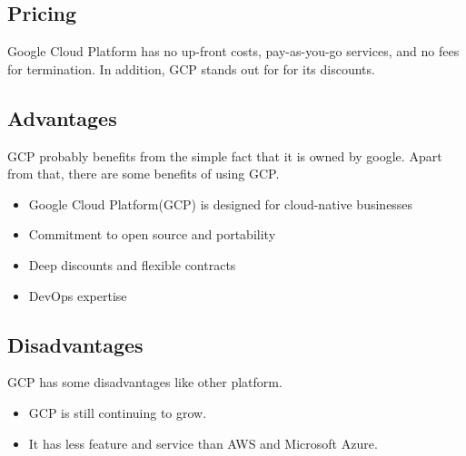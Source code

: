 %
%
\subsection{Pricing}
%
Google Cloud Platform has no up-front costs, pay-as-you-go services, and no fees for termination. In addition, GCP stands out for for its discounts. 
%
\subsection{Advantages}
%
GCP probably benefits from the simple fact that it is owned by google. Apart from that, there are some benefits of using GCP. 
\begin{itemize}
    \item Google Cloud Platform(GCP) is designed for cloud-native businesses
    \item Commitment to open source and portability
    \item Deep discounts and flexible contracts
 \item DevOps expertise

\end{itemize}
%
\subsection{Disadvantages}
%
GCP has some disadvantages like other platform.

\begin{itemize}
    \item GCP is still continuing to grow.
    \item It has less feature and service than AWS and Microsoft Azure. 
\end{itemize}
%